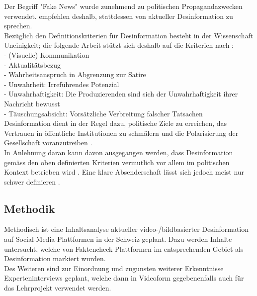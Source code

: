 \documentclass[12pt,a4paper]{article}        %
\begin{document}
Der Begriff "Fake News" wurde zunehmend zu politischen Propagandazwecken verwendet. \Textcite[148]{marx_fake_2020} empfehlen deshalb, stattdessen von aktueller Desinformation zu sprechen. \\
Bezüglich den Definitionskriterien für Desinformation besteht in der Wissenschaft Uneinigkeit; die folgende Arbeit stützt sich deshalb auf die Kriterien nach \textcite{marx_fake_2020}: \\
- (Visuelle) Kommunikation \\
- Aktualitätsbezug \\
- Wahrheitsanspruch in Abgrenzung zur Satire \\
- Unwahrheit: Irreführendes Potenzial \\
- Unwahrhaftigkeit: Die Produzierenden sind sich der Unwahrhaftigkeit ihrer Nachricht bewusst \\
- Täuschungsabsicht: Vorsätzliche Verbreitung falscher Tatsachen\\

Desinformation dient in der Regel dazu, politische Ziele zu erreichen, das Vertrauen in öffentliche Institutionen zu schmälern und die Polarisierung der Gesellschaft voranzutreiben \parencites[vgl.][ ]{allcott_social_2017}[225]{schmidt_meinungsbildung_2022}[162]{lange_unsicherheit_2019}. \\

In Anlehnung daran kann davon ausgegangen werden, dass Desinformation gemäss den oben definierten Kriterien vermutlich vor allem im politischen Kontext betrieben wird \parencites[vgl.][51]{sammer_fake_2021}[217]{allcott_social_2017}[498]{behnke_manipulation_2018}. Eine klare Absenderschaft lässt sich jedoch meist nur schwer definieren \parencite[498-499]{behnke_manipulation_2018}.

\subsection{Methodik}
Methodisch ist eine Inhaltsanalyse aktueller video-/bildbasierter Desinformation auf Social-Media-Plattformen in der Schweiz geplant. Dazu werden Inhalte untersucht, welche von Faktencheck-Plattformen im entsprechenden Gebiet als Desinformation markiert wurden. \\
Des Weiteren sind zur Einordnung und zugunsten weiterer Erkenntnisse Experteninterviews geplant, welche dann in Videoform gegebenenfalls auch für das Lehrprojekt verwendet werden.
\end{document}
